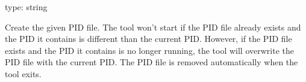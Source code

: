 \documentclass[letterpaper,10pt,english]{sphinxmanual}
\begin{document}

\begin{fulllineitems}
\label{\detokenize{mariadb-archiver:cmdoption-mariadb-archiver-pid}}
type: string

Create the given PID file.  The tool won’t start if the PID file already
exists and the PID it contains is different than the current PID.  However,
if the PID file exists and the PID it contains is no longer running, the
tool will overwrite the PID file with the current PID.  The PID file is
removed automatically when the tool exits.

\end{fulllineitems}

\end{document}
